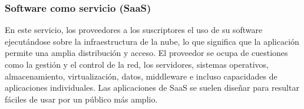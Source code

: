 \subsubsection{Software como servicio (SaaS)}
En este servicio, los proveedores a los suscriptores el uso de su software ejecutándose sobre la infraestructura de la nube, lo que significa que la aplicación permite una amplia distribución y acceso. El proveedor se ocupa de cuestiones como la gestión y el control de la red, los servidores, sistemas operativos, almacenamiento, virtualización, datos, middleware e incluso capacidades de aplicaciones individuales. Las aplicaciones de SaaS se suelen diseñar para resultar fáciles de usar por un público más amplio.